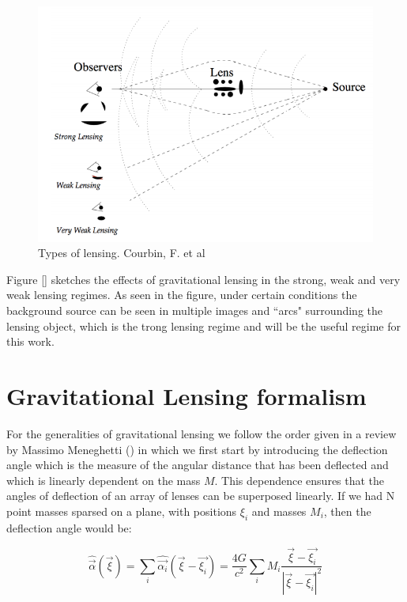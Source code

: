 \begin{figure}[H]
\centering
\includegraphics[width=12cm]{images/types_of_lensing.png}
\caption[Types of lensing]{Types of lensing. Courbin, F. et al \citeyear{Reference24}}
\end{figure}

Figure [] sketches the effects of gravitational lensing in the strong, weak and very weak lensing regimes. As seen in the figure, under certain conditions the background source can be seen in multiple images and ``arcs" surrounding the lensing object, which is the trong lensing regime and will be the useful regime for this work. 

\section{Gravitational Lensing formalism}

For the generalities of gravitational lensing we follow the order given in a review by Massimo Meneghetti (\citeyear{Reference26}) in which we first start by introducing the deflection angle which is the measure of the angular distance that has been deflected and which is linearly dependent on the mass $M$. This dependence ensures that the angles of deflection of an array of lenses can be superposed linearly. If we had N point masses sparsed on a plane, with positions $\xi_i$ and masses $M_{i}$, then the deflection angle would be:

\begin{equation}
\hat{\vec{\alpha}}(\vec{\xi})=\sum_{i}\hat{\vec{\alpha_{i}}}(\vec{\xi}-\vec{\xi_{i}})=\frac{4G}{c^{2}}\sum_{i}M_{i}\frac{\vec{\xi}-\vec{\xi_{i}}}{\left|\vec{\xi}-\vec{\xi_{i}}\right|^{2}}
\end{equation}

